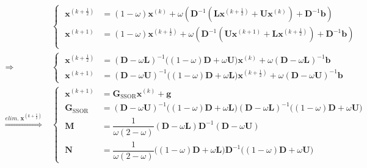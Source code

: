 \documentclass[12pt, UTF8, nofonts]{ctexart}
\begin{document}
\begin{equation}
    \label{eq:ssor}
    \begin{aligned}
        & \left\{ \; \begin{aligned}
            \boldsymbol{x}^{(k+\frac{1}{2})} &= (1-\omega) \boldsymbol{x}^{(k)} + \omega \left( \boldsymbol{D}^{-1} (\boldsymbol{L}\boldsymbol{x}^{(k+\frac{1}{2})} + \boldsymbol{U}\boldsymbol{x}^{(k)}) + \boldsymbol{D}^{-1}\boldsymbol{b} \right) \\
            \boldsymbol{x}^{(k+1)} &= (1-\omega) \boldsymbol{x}^{(k+\frac{1}{2})} + \omega \left( \boldsymbol{D}^{-1} (\boldsymbol{U}\boldsymbol{x}^{(k+1)} + \boldsymbol{L}\boldsymbol{x}^{(k+\frac{1}{2})}) + \boldsymbol{D}^{-1}\boldsymbol{b}\right) \\
        \end{aligned} \right. \\
        \Longrightarrow \; &\left\{ \; \begin{aligned}
            \boldsymbol{x}^{(k+\frac{1}{2})} &= (\boldsymbol{D}-\omega\boldsymbol{L})^{-1}\Big((1-\omega)\boldsymbol{D}+\omega\boldsymbol{U}\Big)\boldsymbol{x}^{(k)} + \omega(\boldsymbol{D}-\omega\boldsymbol{L})^{-1}\boldsymbol{b} \\
            \boldsymbol{x}^{(k+1)} &= (\boldsymbol{D}-\omega\boldsymbol{U})^{-1}\Big((1-\omega)\boldsymbol{D}+\omega\boldsymbol{L}\Big)\boldsymbol{x}^{(k+\frac{1}{2})} + \omega(\boldsymbol{D}-\omega\boldsymbol{U})^{-1}\boldsymbol{b}
        \end{aligned} \right. \\
        \overset{elim.\;\boldsymbol{x}^{(k+\frac{1}{2})}}{\Longrightarrow} \; &\left\{ \; \begin{aligned}
            \boldsymbol{x}^{(k+1)} &= \boldsymbol{G}_{\mathrm{SSOR}}\boldsymbol{x}^{(k)} + \boldsymbol{g} \\
            \boldsymbol{G}_{\mathrm{SSOR}} &= (\boldsymbol{D}-\omega\boldsymbol{U})^{-1}\Big((1-\omega)\boldsymbol{D}+\omega\boldsymbol{L}\Big)(\boldsymbol{D}-\omega\boldsymbol{L})^{-1}\Big((1-\omega)\boldsymbol{D}+\omega\boldsymbol{U}\Big) \\
            \boldsymbol{M} &= \dfrac{1}{\omega(2-\omega)}(\boldsymbol{D}-\omega\boldsymbol{L})\boldsymbol{D}^{-1}(\boldsymbol{D}-\omega\boldsymbol{U}) \\
            \boldsymbol{N} &= \dfrac{1}{\omega(2-\omega)}\Big((1-\omega)\boldsymbol{D}+\omega\boldsymbol{L}\Big)\boldsymbol{D}^{-1}\Big((1-\omega)\boldsymbol{D}+\omega\boldsymbol{U}\Big)
        \end{aligned} \right. \\
    \end{aligned}
\end{equation}
\end{document}
